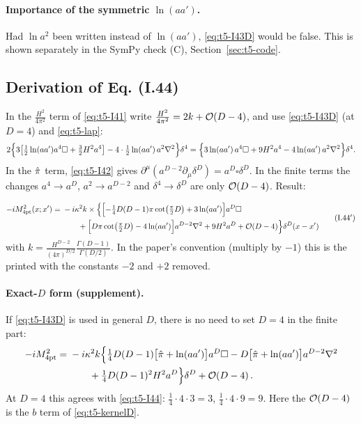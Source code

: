 \paragraph{Importance of the symmetric \(\ln(aa')\).} Had \(\ln a^2\) been written instead of
\(\ln(aa')\), \eqref{eq:t5-I43D} would be false. This is shown separately in the SymPy check
(C), Section~\ref{sec:t5-code}.

\subsection{Derivation of Eq. (I.44) \texorpdfstring{\tD}{}}
In the \(\tfrac{H^2}{4\pi^2}\) term of \eqref{eq:t5-I41} write \(\tfrac{H^2}{4\pi^2}=2k+\mathcal{O}\!\left(D-4\right)\), and use
\eqref{eq:t5-I43D} (at \(D=4\)) and \eqref{eq:t5-lap}:
\begin{equation*}
2\Bigl\{3\bigl[\tfrac12\ln(aa')a^4\square+\tfrac32H^2a^4\bigr]-4\cdot\tfrac12\ln(aa')\,a^2\nabla^2\Bigr\}\delta^4
=\Bigl\{3\ln(aa')\,a^4\square+9H^2a^4-4\ln(aa')\,a^2\nabla^2\Bigr\}\delta^4 .
\end{equation*}
In the \(\hat\pi\) term, \eqref{eq:t5-I42} gives \(\partial^\mu(a^{D-2}\partial_\mu\delta^D)=a^D\square\delta^D\). In the
finite terms the changes \(a^4\to a^D\), \(a^2\to a^{D-2}\) and \(\delta^4\to\delta^D\) are only
\(\mathcal{O}\!\left(D-4\right)\). Result:
\begin{resultbox}
\begin{equation*}\label{eq:t5-I44}
\begin{aligned}
-iM^2_{\rm 4pt}(x;x')={}&-i\kappa^2k\times\Bigl\{\Bigl[-\tfrac14D(D-1)\pi\cot\bigl(\tfrac\pi2D\bigr)+3\ln(aa')\Bigr]a^D\square\\
&\qquad+\Bigl[D\pi\cot\bigl(\tfrac\pi2D\bigr)-4\ln(aa')\Bigr]a^{D-2}\nabla^2+9H^2a^D+\mathcal{O}\!\left(D-4\right)\Bigr\}\delta^D(x-x')
\end{aligned}
\tag{I.44$'$}
\end{equation*}
with \(k=\frac{H^{D-2}}{(4\pi)^{D/2}}\frac{\Gamma(D-1)}{\Gamma(D/2)}\).
In the paper's convention (multiply by \(-1\)) this is the printed  with the
constants \(-2\) and \(+2\) removed.
\end{resultbox}

\paragraph{Exact-\(D\) form (supplement).} If \eqref{eq:t5-I43D} is used in general \(D\), there is
no need to set \(D=4\) in the finite part:
\begin{equation}\label{eq:t5-exactD}
\begin{aligned}-iM^2_{\rm 4pt}={}&-i\kappa^2k\Bigl\{\tfrac14D(D-1)\bigl[\hat\pi+\ln(aa')\bigr]a^D\square-D\bigl[\hat\pi+\ln(aa')\bigr]a^{D-2}\nabla^2\\
&\qquad+\tfrac14D(D-1)^2H^2a^D\Bigr\}\delta^D+\mathcal{O}\!\left(D-4\right).\end{aligned}
\end{equation}
At \(D=4\) this agrees with \eqref{eq:t5-I44}: \(\tfrac14\cdot4\cdot3=3\), \(\tfrac14\cdot4\cdot9=9\).
Here the \(\mathcal{O}\!\left(D-4\right)\) is the \(b\) term of \eqref{eq:t5-kernelD}.

